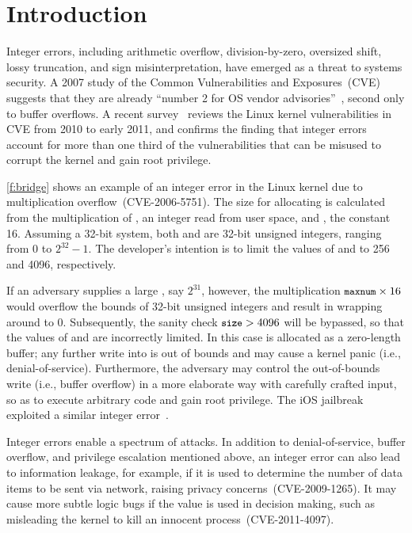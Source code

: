 \section{Introduction}
\label{s:intro}

Integer errors, including arithmetic overflow, division-by-zero,
oversized shift, lossy truncation, and sign misinterpretation, have
emerged as a threat to systems security.  A 2007 study of the
Common Vulnerabilities and Exposures~(CVE)~\cite{cve} suggests that
they are already ``number 2 for OS vendor
advisories''~\cite{christey:vuln}, second only to buffer overflows.
A recent survey~\cite{chen:kbugs} reviews the Linux kernel
vulnerabilities in CVE from 2010 to early 2011, and confirms
the finding that integer errors account for more than one third of
the vulnerabilities that can be misused to corrupt the kernel and
gain root privilege.

\autoref{f:bridge} shows an example of an integer error in the Linux
kernel due to multiplication overflow~(CVE-2006-5751).  The size
for allocating  is calculated from the multiplication of
, an integer read from user space,
and , the constant 16.  Assuming
a 32-bit system, both  and  are 32-bit unsigned
integers, ranging from 0 to $2^{32} - 1$.  The developer's intention
is to limit the values of  and  to 256 and 4096,
respectively.

If an adversary supplies a large , say $2^{31}$, however,
the multiplication $\cc{maxnum} \times 16$ would overflow the bounds
of 32-bit unsigned integers and result in  wrapping around
to 0.  Subsequently, the sanity check $\cc{size} > 4096$
will be bypassed, so that the values of  and 
are incorrectly limited.  In this case  is allocated as
a zero-length buffer; any further write into  is out of
bounds and may cause a kernel panic (i.e., denial-of-service).
Furthermore, the adversary may control the out-of-bounds write
(i.e., buffer overflow) in a more elaborate way with carefully
crafted input, so as to execute arbitrary code and gain root
privilege. The iOS jailbreak exploited a similar integer 
error~\cite{esser:ios}.

Integer errors enable a spectrum of attacks.  In addition to
denial-of-service, buffer overflow, and privilege escalation
mentioned above, an integer error can also lead to information
leakage, for example, if it is used to determine the number of data
items to be sent via network, raising privacy concerns~(CVE-2009-1265).
It may cause more subtle logic bugs if the value is used in decision
making, such as misleading the kernel to kill an innocent
process~(CVE-2011-4097).

